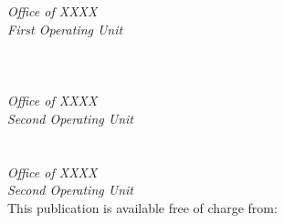 \begin{titlepage}
\begin{flushright}
\tagpdfparaOn
\vfill
\normalsize \authorone\\
\authortwo\\
\authorthree\\
\authorfour\\
\textit{Office of XXXX}\\
\textit{First Operating Unit}\\
\vspace{12pt}
\authorfive\\
\authorsix\\
\authorseven\\
\textit{Office of XXXX}\\
\textit{Second Operating Unit}\\
\vspace{12pt}
\authoreight\\
\authornine\\
\textit{Office of XXXX}\\
\textit{Second Operating Unit}\\
\vfill
\normalsize This publication is available free of charge from:\\
\DOI\\
\vfill
\normalsize \pubmonth~\pubyear\\

\vfill
\tagpdfparaOff {}%
%


\end{flushright}
\end{titlepage}
